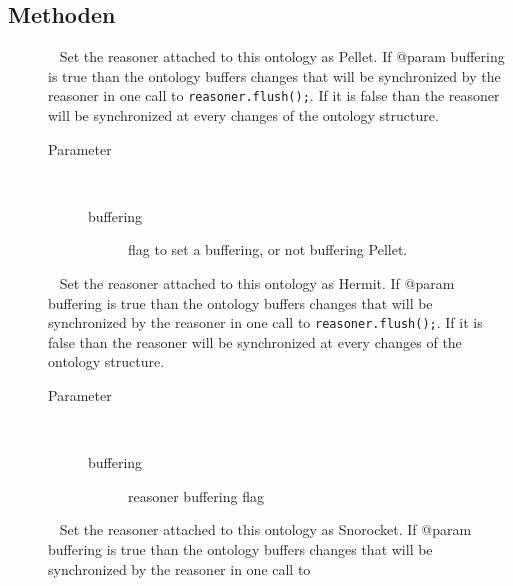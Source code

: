 \subsection{Methoden}
\begin{description}
\item[{\label{ontologyFramework.OFContextManagement.OWLReferences.setPelletReasoner(java.lang.Boolean)}}]
~ Set the reasoner attached to this ontology as Pellet.
 If @param buffering is true than the ontology buffers 
 changes that will be synchronized by the reasoner in one call to 
 \verb!reasoner.flush();!. If it is false than the reasoner will
 be synchronized at every changes of the ontology structure.
\begin{description}
\item[Parameter] ~
\begin{description}
\item[buffering]
flag to set a buffering, or not buffering Pellet.
\end{description}
\end{description}
\item[{\label{ontologyFramework.OFContextManagement.OWLReferences.setHermitReasoner(java.lang.Boolean)}}]
~ Set the reasoner attached to this ontology as Hermit.
 If @param buffering is true than the ontology buffers 
 changes that will be synchronized by the reasoner in one call to 
 \verb!reasoner.flush();!. If it is false than the reasoner will
 be synchronized at every changes of the ontology structure.
\begin{description}
\item[Parameter] ~
\begin{description}
\item[buffering]
reasoner buffering flag
\end{description}
\end{description}
\item[{\label{ontologyFramework.OFContextManagement.OWLReferences.setSnorocketReasoner(java.lang.Boolean)}}]
~ Set the reasoner attached to this ontology as Snorocket.
 If @param buffering is true than the ontology buffers 
 changes that will be synchronized by the reasoner in one call to 

\end{description}
